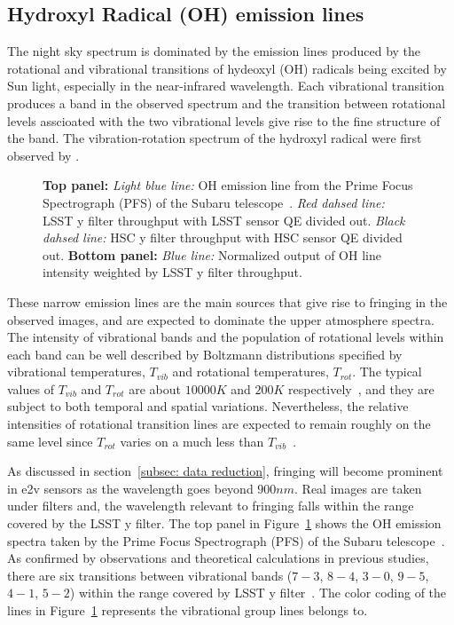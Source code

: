 \documentclass[twocolumn]{aastex63} %
\begin{document}
\begin{CJK*}{UTF8}{gbsn}
\subsection{Hydroxyl Radical (OH) emission lines}\label{sec: OH line + y filter}
 The night sky spectrum is dominated by the emission lines produced by the rotational and vibrational transitions of hydeoxyl (OH) radicals being excited by Sun light, especially in the near-infrared wavelength. Each vibrational transition produces a band in the observed spectrum and the transition between rotational levels asscioated with the two vibrational levels give rise to the fine structure of the band. The vibration-rotation spectrum of the hydroxyl radical were first observed by \citet{Meinel50a,Meinel50b}.
\begin{figure}[htb]
\centering
{}
\caption{\textbf{Top panel:} {\it Light blue line:} OH emission line from the Prime Focus Spectrograph (PFS) of the Subaru telescope~\citep{Tamura16}. {\it Red dahsed line:} LSST y filter throughput with LSST sensor QE divided out. {\it Black dahsed line:} HSC y filter throughput with HSC sensor QE divided out. \textbf{Bottom panel:} {\it Blue line:} Normalized output of OH line intensity weighted by LSST y filter throughput.}
\label{fig:OH_spec}
\end{figure}
These narrow emission lines are the main sources that give rise to fringing in the observed images, and are expected to dominate the upper atmosphere spectra. The intensity of vibrational bands and the population of rotational levels within each band can be well described by Boltzmann distributions specified by vibrational temperatures, $T_{vib}$ and rotational temperatures, $T_{rot}$. The typical values of $T_{vib}$ and $T_{rot}$ are about $10000K$ and $200K$ respectively~\citep{Rousselot00}, and they are subject to both temporal and spatial variations.  Nevertheless, the relative intensities of rotational transition lines are expected to remain roughly on the same level since $T_{rot}$ varies on a much less than $T_{vib}$~\citep{Noll15,Hart19}.

As discussed in section~\ref{subsec: data reduction}, fringing will become prominent in e2v sensors as the wavelength goes beyond $900nm$. Real images are taken under filters and, the wavelength relevant to fringing falls within the range covered by the LSST y filter. The top panel in Figure~\ref{fig:OH_spec} shows the OH emission spectra taken by the Prime Focus Spectrograph (PFS) \citep{rlh} of the Subaru telescope~\citep{Tamura16}. As confirmed by observations and theoretical calculations in previous studies, there are six transitions between vibrational bands ($7-3$, $8-4$, $3-0$, $9-5$, $4-1$, $5-2$) within the range covered by LSST y filter~\citep{Noll15,Osterbrock96,Osterbrock97,Rousselot00}. The color coding of the lines in Figure~\ref{fig:OH_spec} represents the vibrational group lines belongs to. 


\end{CJK*}
\end{document}

